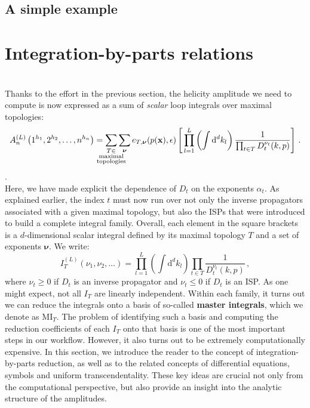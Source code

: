 \documentclass[main.tex]{subfiles}
\begin{document}
\subsection{A simple example}

\section{Integration-by-parts relations} \label{sec:IBP}
\\
Thanks to the effort in the previous section, the helicity amplitude we need to compute is now expressed as a sum of \textit{scalar} loop integrals over maximal topologies:
\begin{equation} \label{eq:ampreducedschematic}
    	A_n^{(L)} \left(1^{h_1}, 2^{h_2}, \ldots, n^{h_n} \right) =  
     \sum_{\mathclap{\substack{T \in \\ \text{maximal} \\ \text{topologies}}}} \sum_{\bm{\nu}} e_{T, \bm{\nu}}(p(\mathbf{x}), \eps) \left[\, \prod_{l=1}^{L} \left(\int \mathrm{d}^d k_l \right) \frac{1}{\prod_{t\in T} D^{\nu_t}_t(k,p)} \right]\,.
\end{equation}
.\\
Here, we have made explicit the dependence of $D_t$ on the exponents $\alpha_t$. As explained earlier, the index $t$ must now run over not only the inverse propagators associated with a given maximal topology, but also the ISPs that were introduced to build a complete integral family. Overall, each element in the square brackets is a $d$-dimensional scalar integral defined by its maximal topology $T$ and a set of exponents $\bm{\nu}$. We write:
\begin{equation} \label{eq:ibpintegral}
    I_T^{(L)}(\nu_1, \nu_2, \ldots) = \prod_{l=1}^{L} \left(\int \mathrm{d}^d k_l \right) \prod_{t\in T} \frac{1}{D^{\nu_t}_t(k,p)}\,,
\end{equation}
where $\nu_t \geq 0$ if $D_t$ is an inverse propagator and $\nu_t\le0$ if $D_t$ is an ISP. As one might expect, not all $I_T$ are linearly independent. Within each family, it turns out we can reduce the integrals onto a basis of so-called \textbf{master integrals}, which we denote as $\text{MI}_T$. The problem of identifying such a basis and computing the reduction coefficients of each $I_T$ onto that basis is one of the most important steps in our workflow. However, it also turns out to be extremely computationally expensive. In this section, we introduce the reader to the concept of integration-by-parts reduction, as well as to the related concepts of differential equations, symbols and uniform transcendentality. These key ideas are crucial not only from the computational perspective, but also provide an insight into the analytic structure of the amplitudes.
\end{document}
